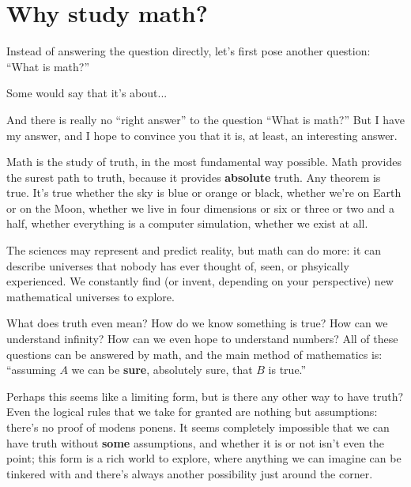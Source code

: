 \section{Why study math?}

Instead of answering the question directly, let's first pose another question: ``What is math?''

Some would say  that it's about...

And there is really no ``right answer'' to the question ``What is math?''
But I have my answer, and I hope to convince you that it is, at least, an interesting answer.

Math is the study of truth, in the most fundamental way possible.
Math provides the surest path to truth, because it provides \textbf{absolute} truth.
Any theorem is true.
It's true whether the sky is blue or orange or black, whether we're on Earth or on the Moon, whether we live in four dimensions or six or three or two and a half, whether everything is a computer simulation, whether we exist at all.

The sciences may represent and predict reality, but math can do more: it can describe universes that nobody has ever thought of, seen, or phsyically experienced.
We constantly find (or invent, depending on your perspective) new mathematical universes to explore.

What does truth even mean?
How do we know something is true?
How can we understand infinity?
How can we even hope to understand numbers?
All of these questions can be answered by math, and the main method of mathematics is: ``assuming $A$ we can be \textbf{sure}, absolutely sure, that $B$ is true.''

Perhaps this seems like a limiting form, but is there any other way to have truth?
Even the logical rules that we take for granted are nothing but assumptions: there's no proof of modens ponens.
It seems completely impossible that we can have truth without \textbf{some} assumptions, and whether it is or not isn't even the point; this form is a rich world to explore, where anything we can imagine can be tinkered with and there's always another possibility just around the corner.


